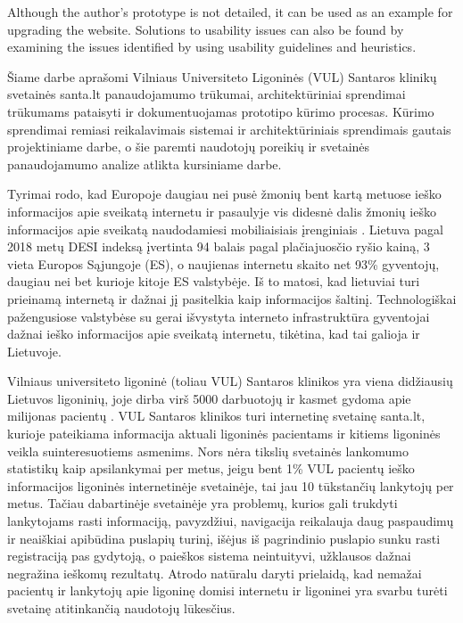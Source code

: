 \documentclass{VUMIFPSbakalaurinis}
\begin{document}
Although the author's prototype is not detailed, it can be used as an example for upgrading the website. Solutions to usability issues can also be found by examining the issues identified by using usability guidelines and heuristics.


\tableofcontents

Šiame darbe aprašomi Vilniaus Universiteto Ligoninės (VUL) Santaros klinikų svetainės santa.lt panaudojamumo trūkumai, architektūriniai sprendimai trūkumams pataisyti ir dokumentuojamas prototipo kūrimo procesas. Kūrimo sprendimai remiasi reikalavimais sistemai ir architektūriniais sprendimais gautais projektiniame darbe, o šie paremti naudotojų poreikių ir svetainės panaudojamumo analize atlikta kursiniame darbe.

Tyrimai rodo, kad Europoje daugiau nei pusė žmonių bent kartą metuose ieško informacijos apie sveikatą internetu \cite{EuCitizDigHealthEn} ir pasaulyje vis didesnė dalis žmonių ieško informacijos apie sveikatą naudodamiesi mobiliaisiais įrenginiais \cite{EmergingmHealthEn}. Lietuva pagal 2018 metų DESI indeksą įvertinta 94 balais pagal plačiajuosčio ryšio kainą, 3 vieta Europos Sąjungoje (ES), o naujienas internetu skaito net 93\% gyventojų, daugiau nei bet kurioje kitoje ES valstybėje\cite{InternetasLt}. Iš to matosi, kad lietuviai turi prieinamą internetą ir dažnai jį pasitelkia kaip informacijos šaltinį. Technologiškai pažengusiose valstybėse su gerai išvystyta interneto infrastruktūra gyventojai dažnai ieško informacijos apie sveikatą internetu\cite{InternetUseByPublicSAEn}\cite{InternetUseByPublicHKEn}, tikėtina, kad tai galioja ir Lietuvoje.

Vilniaus universiteto ligoninė (toliau VUL) Santaros klinikos yra viena didžiausių Lietuvos ligoninių, joje dirba virš 5000 darbuotojų ir kasmet gydoma apie milijonas pacientų \cite{VulSkApieMusLt}. VUL Santaros klinikos turi internetinę svetainę santa.lt, kurioje pateikiama informacija aktuali ligoninės pacientams ir kitiems ligoninės veikla suinteresuotiems asmenims. Nors nėra tikslių svetainės lankomumo statistikų kaip apsilankymai per metus, jeigu bent 1\% VUL pacientų ieško informacijos ligoninės internetinėje svetainėje, tai jau 10 tūkstančių lankytojų per metus. Tačiau dabartinėje svetainėje yra problemų, kurios gali trukdyti lankytojams rasti informaciją, pavyzdžiui, navigacija reikalauja daug paspaudimų ir neaiškiai apibūdina puslapių turinį, išėjus iš pagrindinio puslapio sunku rasti registraciją pas gydytoją, o paieškos sistema neintuityvi, užklausos dažnai negražina ieškomų rezultatų. Atrodo natūralu daryti prielaidą, kad nemažai pacientų ir lankytojų apie ligoninę domisi internetu ir ligoninei yra svarbu turėti svetainę atitinkančią naudotojų lūkesčius.
\end{document}

